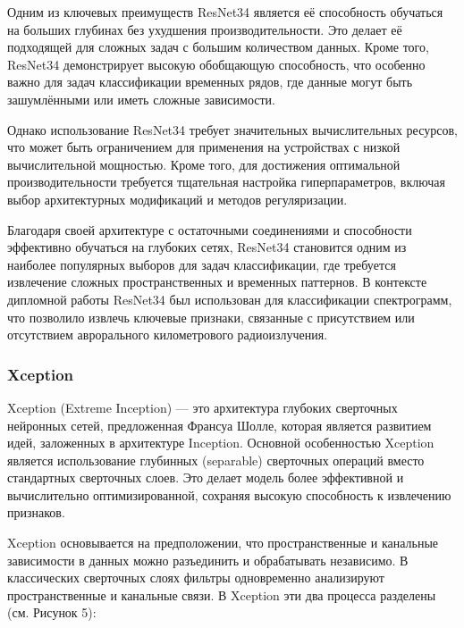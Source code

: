\documentclass[spec, och, diploma]{SCWorks}
\begin{document}
            Одним из ключевых преимуществ ResNet34 является её способность
            обучаться на больших глубинах без ухудшения производительности. Это
            делает её подходящей для сложных задач с большим количеством данных.
            Кроме того, ResNet34 демонстрирует высокую обобщающую способность,
            что особенно важно для задач классификации временных рядов, где
            данные могут быть зашумлёнными или иметь сложные зависимости.

            Однако использование ResNet34 требует значительных вычислительных
            ресурсов, что может быть ограничением для применения на устройствах
            с низкой вычислительной мощностью. Кроме того, для достижения
            оптимальной производительности требуется тщательная настройка
            гиперпараметров, включая выбор архитектурных модификаций и методов
            регуляризации.

            Благодаря своей архитектуре с остаточными соединениями и способности
            эффективно обучаться на глубоких сетях, ResNet34 становится одним из
            наиболее популярных выборов для задач классификации, где требуется
            извлечение сложных пространственных и временных паттернов. В
            контексте дипломной работы ResNet34 был использован для
            классификации спектрограмм, что позволило извлечь ключевые признаки,
            связанные с присутствием или отсутствием аврорального километрового
            радиоизлучения.

        \subsubsection{Xception}
        
            Xception (Extreme Inception) — это архитектура глубоких сверточных
            нейронных сетей, предложенная Франсуа Шолле, которая является
            развитием идей, заложенных в архитектуре Inception. Основной
            особенностью Xception является использование глубинных (separable)
            сверточных операций вместо стандартных сверточных слоев. Это делает
            модель более эффективной и вычислительно оптимизированной, сохраняя
            высокую способность к извлечению признаков. \cite{xception}
        
            Xception основывается на предположении, что пространственные и
            канальные зависимости в данных можно разъединить и обрабатывать
            независимо. В классических сверточных слоях фильтры одновременно
            анализируют пространственные и канальные связи. В Xception эти два
            процесса разделены (см. Рисунок 5):
            
\end{document}
